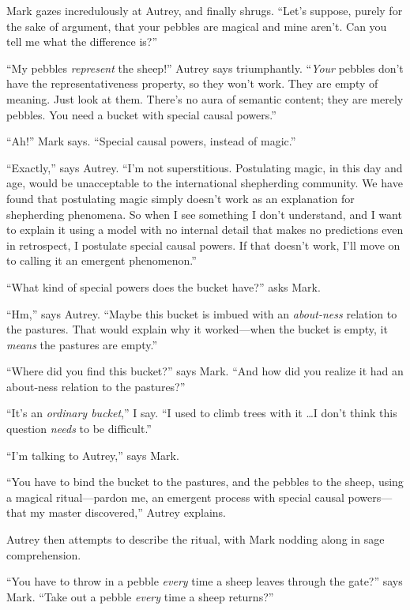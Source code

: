 {
 Mark gazes incredulously at Autrey, and finally shrugs.
``Let's suppose, purely for the sake
of argument, that your pebbles are magical and mine
aren't. Can you tell me what the difference
is?''}

{
 ``My pebbles \textit{represent} the
sheep!'' Autrey says triumphantly.
``\textit{Your} pebbles don't have the
representativeness property, so they won't work. They
are empty of meaning. Just look at them. There's no
aura of semantic content; they are merely pebbles. You need a bucket
with special causal powers.''}

{
 ``Ah!'' Mark says.
``Special causal powers, instead of
magic.''}

{
 ``Exactly,'' says Autrey.
``I'm not superstitious. Postulating
magic, in this day and age, would be unacceptable to the international
shepherding community. We have found that postulating magic simply
doesn't work as an explanation for shepherding
phenomena. So when I see something I don't understand,
and I want to explain it using a model with no internal detail that
makes no predictions even in retrospect, I postulate special causal
powers. If that doesn't work, I'll move
on to calling it an emergent phenomenon.''}

{
 ``What kind of special powers does the bucket
have?'' asks Mark.}

{
 ``Hm,'' says Autrey.
``Maybe this bucket is imbued with an
\textit{about-ness} relation to the pastures. That would explain why it
worked---when the bucket is empty, it \textit{means} the pastures are
empty.''}

{
 ``Where did you find this
bucket?'' says Mark. ``And how did
you realize it had an about-ness relation to the
pastures?''}

{
 ``It's an \textit{ordinary
bucket},'' I say. ``I used to climb
trees with it \ldots I don't think this question
\textit{needs} to be difficult.''}

{
 ``I'm talking to
Autrey,'' says Mark.}

{
 ``You have to bind the bucket to the pastures,
and the pebbles to the sheep, using a magical ritual---pardon me, an
emergent process with special causal powers---that my master
discovered,'' Autrey explains.}

{
 Autrey then attempts to describe the ritual, with Mark nodding
along in sage comprehension.}

{
 ``You have to throw in a pebble \textit{every}
time a sheep leaves through the gate?'' says Mark.
``Take out a pebble \textit{every} time a sheep
returns?''}


